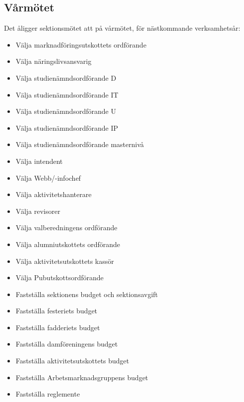 \documentclass{datateknologsektionen-document}
\begin{document}
    \subsection{Vårmötet}
      Det åligger sektionsmötet att på vårmötet, för nästkommande verksamhetsår:
      \begin{itemize}
        \item Välja marknadföringsutskottets ordförande
        \item Välja näringslivsansvarig
        \item Välja studienämndsordförande D
        \item Välja studienämndsordförande IT
        \item Välja studienämndsordförande U
        \item Välja studienämndsordförande IP
        \item Välja studienämndsordförande masternivå
        \item Välja intendent
        \item Välja Webb/-infochef
        \item Välja aktivitetshanterare
        \item Välja revisorer
        \item Välja valberedningens ordförande
        \item Välja alumniutskottets ordförande
        \item Välja aktivitetsutskottets kassör
        \item Välja Pubutskottsordförande
        \item Fastställa sektionens budget och sektionsavgift
        \item Fastställa festeriets budget
        \item Fastställa fadderiets budget
        \item Fastställa damföreningens budget
        \item Fastställa aktivitetsutskottets budget
        \item Fastställa Arbetsmarknadsgruppens budget
        \item Fastställa reglemente
      \end{itemize}
\end{document}
